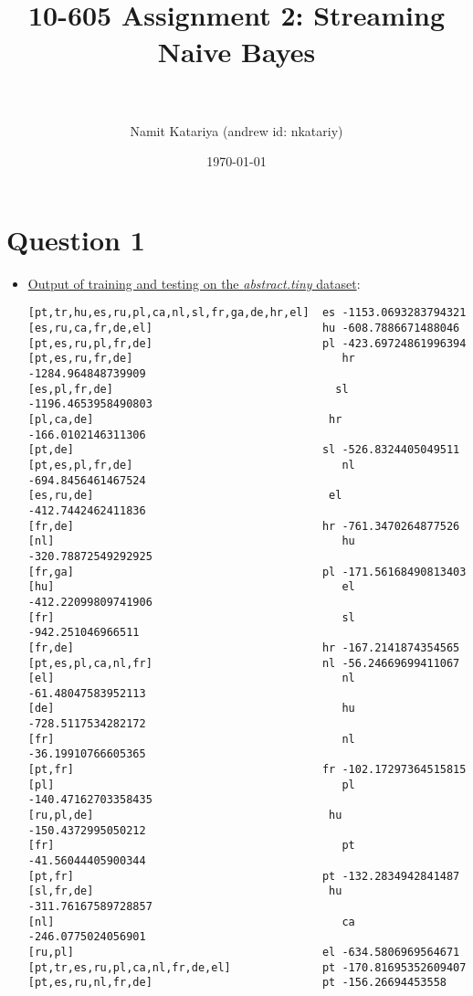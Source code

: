 \documentclass[paper=a4, fontsize=11pt]{scrartcl} %
\title{	
\normalfont \normalsize 
\horrule{0.5pt} \\[0.4cm] %
\huge{10-605 Assignment 2: Streaming Naive Bayes} \\ %
\horrule{2pt} \\[0.5cm] %
}
\author{Namit Katariya (andrew id: nkatariy)} %
\date{\normalsize\today} %
\numberwithin{equation}{section} %
\numberwithin{figure}{section} %
\numberwithin{table}{section} %
\begin{document}
\maketitle 

\section*{\textbf{Question 1}}

\begin{itemize}
\item \underline{Output of training and testing on the \textit{abstract.tiny} dataset}:
\begin{verbatim}
[pt,tr,hu,es,ru,pl,ca,nl,sl,fr,ga,de,hr,el]	 es	-1153.0693283794321
[es,ru,ca,fr,de,el]	                         hu	-608.7886671488046
[pt,es,ru,pl,fr,de]	                         pl	-423.69724861996394
[pt,es,ru,fr,de]	                            hr	-1284.964848739909
[es,pl,fr,de]	                               sl	-1196.4653958490803
[pl,ca,de]	                                  hr	-166.0102146311306
[pt,de]	                                     sl	-526.8324405049511
[pt,es,pl,fr,de]	                            nl	-694.8456461467524
[es,ru,de]	                                  el	-412.7442462411836
[fr,de]	                                     hr	-761.3470264877526
[nl]	                                        hu	-320.78872549292925
[fr,ga]	                                     pl	-171.56168490813403
[hu]	                                        el	-412.22099809741906
[fr]	                                        sl	-942.251046966511
[fr,de]	                                     hr	-167.2141874354565
[pt,es,pl,ca,nl,fr]	                         nl	-56.24669699411067
[el]	                                        nl	-61.48047583952113
[de]	                                        hu	-728.5117534282172
[fr]	                                        nl	-36.19910766605365
[pt,fr]	                                     fr	-102.17297364515815
[pl]	                                        pl	-140.47162703358435
[ru,pl,de]	                                  hu	-150.4372995050212
[fr]                                        	pt	-41.56044405900344
[pt,fr]	                                     pt	-132.2834942841487
[sl,fr,de]	                                  hu	-311.76167589728857
[nl]	                                        ca	-246.0775024056901
[ru,pl]	                                     el	-634.5806969564671
[pt,tr,es,ru,pl,ca,nl,fr,de,el]	             pt	-170.81695352609407
[pt,es,ru,nl,fr,de]	                         pt	-156.26694453558

\end{verbatim}
\end{itemize}
\end{document}
